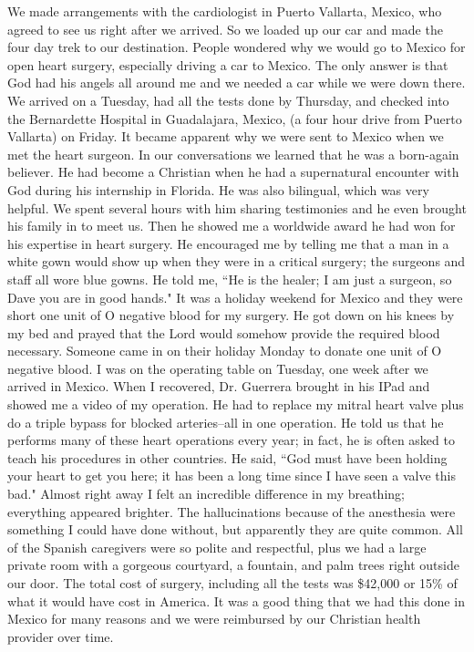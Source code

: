 \documentclass[oneside]{book}
\begin{document}
We made arrangements with the cardiologist in Puerto Vallarta, Mexico, who agreed to see us right after we arrived. So we loaded up our car and made the four day trek to our destination. People wondered why we would go to Mexico for open heart surgery, especially driving a car to Mexico. The only answer is that God had his angels all around me and we needed a car while we were down there. We arrived on a Tuesday, had all the tests done by Thursday, and checked into the Bernardette Hospital in Guadalajara, Mexico, (a four hour drive from Puerto Vallarta) on Friday. It became apparent why we were sent to Mexico when we met the heart surgeon. In our conversations we learned that he was a born-again believer. He had become a Christian when he had a supernatural encounter with God during his internship in Florida. He was also bilingual, which was very helpful. We spent several hours with him sharing testimonies and he even brought his family in to meet us. Then he showed me a worldwide award he had won for his expertise in heart surgery. He encouraged me by telling me that a man in a white gown would show up when they were in a critical surgery; the surgeons and staff all wore blue gowns. He told me, ``He is the healer; I am just a surgeon, so Dave you are in good hands." It was a holiday weekend for Mexico and they were short one unit of O negative blood for my surgery. He got down on his knees by my bed and prayed that the Lord would somehow provide the required blood necessary. Someone came in on their holiday Monday to donate one unit of O negative blood. I was on the operating table on Tuesday, one week after we arrived in Mexico.
When I recovered, Dr. Guerrera brought in his IPad and showed me a video of my operation. He had to replace my mitral heart valve plus do a triple bypass for blocked arteries--all in one operation. He told us that he performs many of these heart operations every year; in fact, he is often asked to teach his procedures in other countries. He said, ``God must have been holding your heart to get you here; it has been a long time since I have seen a valve this bad." Almost right away I felt an incredible difference in my breathing; everything appeared brighter. The hallucinations because of the anesthesia were something I could have done without, but apparently they are quite common. All of the Spanish caregivers were so polite and respectful, plus we had a large private room with a gorgeous courtyard, a fountain, and palm trees right outside our door. The total cost of surgery, including all the tests was \$42,000 or 15\% of what it would have cost in America. It was a good thing that we had this done in Mexico for many reasons and we were reimbursed by our Christian health provider over time. 
\end{document}
